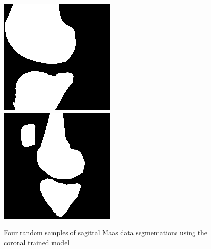 \begin{figure}[H]
\endminipage\hfill
{}%
  \includegraphics[width=\linewidth]{imgs/transfer_pers_y3.png}
\endminipage\hfill
{}%
  \includegraphics[width=\linewidth]{imgs/transfer_pers_y4.png}
\endminipage
\caption{Four random samples of sagittal Maas data segmentations using the coronal trained model}
\end{figure}

